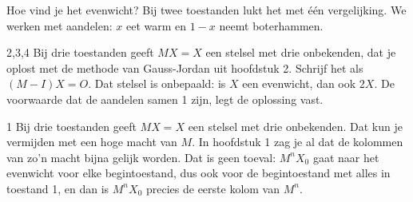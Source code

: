 Hoe vind je het evenwicht? Bij twee toestanden lukt het met één vergelijking. We werken met aandelen: $x$ eet warm en $1 - x$ neemt boterhammen.


\begin{alleenvoor}{2,3,4}
Bij drie toestanden geeft $MX = X$ een stelsel met drie onbekenden, dat je oplost met de methode van Gauss-Jordan uit hoofdstuk 2. Schrijf het als $(M - I)X = O$. Dat stelsel is onbepaald: is $X$ een evenwicht, dan ook $2X$. De voorwaarde dat de aandelen samen 1 zijn, legt de oplossing vast.
\end{alleenvoor}
\begin{alleenvoor}{1}
Bij drie toestanden geeft $MX = X$ een stelsel met drie onbekenden. Dat kun je vermijden met een hoge macht van $M$. In hoofdstuk 1 zag je al dat de kolommen van zo'n macht bijna gelijk worden. Dat is geen toeval: $M^{n} X_0$ gaat naar het evenwicht voor elke begintoestand, dus ook voor de begintoestand met alles in toestand 1, en dan is $M^n X_0$ precies de eerste kolom van $M^n$.
\end{alleenvoor}


